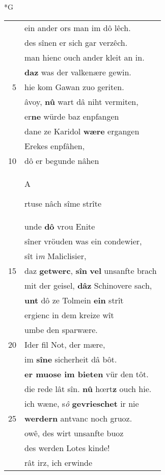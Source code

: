 \documentclass[8pt,a4paper,notitlepage]{article}
\begin{document}
\newpage
\begin{table}[ht]
\begin{minipage}[t]{0.5\linewidth}
\small
\begin{center}*G
\end{center}
\begin{tabular}{rl}
 & ein ander ors man im dô lêch.\\ 
 & des sînen er sich gar verzêch.\\ 
 & man hienc ouch ander kleit an in.\\ 
 & \textbf{daz} was der valkenære gewin.\\ 
5 & hie kom Gawan zuo geriten.\\ 
 & âvoy, \textbf{nû} wart dâ niht vermiten,\\ 
 & er\textbf{ne} würde baz enpfangen\\ 
 & dane ze Karidol \textbf{wære} ergangen\\ 
 & Erekes enpfâhen,\\ 
10 & dô er begunde nâhen\\ 
 & \begin{large}A\end{large}rtuse nâch sîme strîte\\ 
 & unde \textbf{dô} vrou Enite\\ 
 & sîner vröuden was ein condewier,\\ 
 & sît i\textit{m} Maliclisier,\\ 
15 & daz \textbf{getwerc}, \textbf{sîn} \textbf{vel} unsanfte brach\\ 
 & mit der geisel, \textbf{dâz} Schinovere sach,\\ 
 & \textbf{unt} dô ze Tolmein \textbf{ein} strît\\ 
 & ergienc in dem kreize wît\\ 
 & umbe den sparwære.\\ 
20 & Ider fil Not, der mære,\\ 
 & im \textbf{sîne} sicherheit dâ bôt.\\ 
 & \textbf{er muose im bieten} vür den tôt.\\ 
 & die rede lât sîn. \textbf{nû} hœrt\textbf{z} ouch hie.\\ 
 & ich wæne, s\textit{ô} \textbf{gevrieschet} ir nie\\ 
25 & \textbf{werdern} antvanc noch gruoz.\\ 
 & owê, des wirt unsanfte buoz\\ 
 & des werden Lotes kinde!\\ 
 & rât irz, ich erwinde\\ 

\end{tabular}
\end{minipage}
\end{table}
\end{document}
